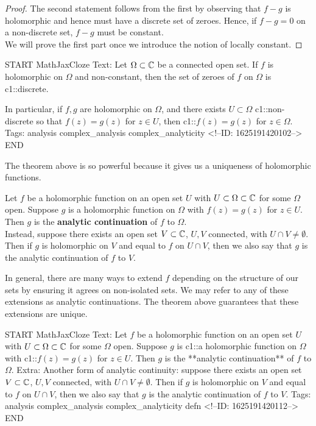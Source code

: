 \documentclass{memoir}
\begin{document}
\begin{proof}
	The second statement follows from the first by observing that \(f-g \) is holomorphic and hence must have a discrete set of zeroes. Hence, if \(f-g=0\) on a non-discrete set, \(f-g\) must be constant.\\

	We will prove the first part once we introduce the notion of locally constant.
\end{proof}

\begin{anki}
START
MathJaxCloze
Text: Let \(\Omega \subset \mathbb{C}\) be a connected open set. If \(f\) is holomorphic on \(\Omega \) and non-constant, then the set of zeroes of \(f\) on \(\Omega \) is {{c1::discrete}}.

	In particular, if \(f,g\) are holomorphic on \(\Omega \), and there exists \(U\subset \Omega \) {{c1::non-discrete}} so that \(f(z)=g(z)\) for \(z \in U\), then {{c1::\(f(z)=g(z)\) for \(z \in \Omega \)}}.
Tags: analysis complex_analysis complex_analyticity
<!--ID: 1625191420102-->
END
\end{anki}


The theorem above is so powerful because it gives us a uniqueness of holomorphic functions.

\begin{defn}
	Let \(f\) be a holomorphic function on an open set \(U\) with \(U\subset \Omega \subset \mathbb{C} \) for some \(\Omega \) open. Suppose \(g\) is a holomorphic function on \(\Omega \) with \(f(z)=g(z)\) for \(z \in U\). Then \(g\) is the \textbf{analytic continuation} of \(f\) to \(\Omega \).\\

	Instead, suppose there exists an open set \(V \subset \mathbb{C}\), \(U,V\) connected, with \(U\cap V \neq \emptyset\). Then if \(g\) is holomorphic on \(V\) and equal to \(f\) on \(U\cap V\), then we also say that \(g\) is the analytic continuation of \(f\) to \(V\).
\end{defn}
In general, there are many ways to extend \(f\) depending on the structure of our sets by ensuring it agrees on non-isolated sets. We may refer to any of these extensions as analytic continuations. The theorem above guarantees that these extensions are unique.

\begin{anki}
START
MathJaxCloze
Text: Let \(f\) be a holomorphic function on an open set \(U\) with \(U\subset \Omega \subset \mathbb{C} \) for some \(\Omega \) open. Suppose \(g\) is {{c1::a holomorphic function}} on \(\Omega \) with {{c1::\(f(z)=g(z)\)}} for \(z \in U\). Then \(g\) is the **analytic continuation** of \(f\) to \(\Omega \).
Extra: Another form of analytic continuity: suppose there exists an open set \(V \subset \mathbb{C}\), \(U,V\) connected, with \(U\cap V \neq \emptyset\). Then if \(g\) is holomorphic on \(V\) and equal to \(f\) on \(U\cap V\), then we also say that \(g\) is the analytic continuation of \(f\) to \(V\).
Tags: analysis complex_analysis complex_analyticity defn
<!--ID: 1625191420112-->
END
\end{anki}
\end{document}
